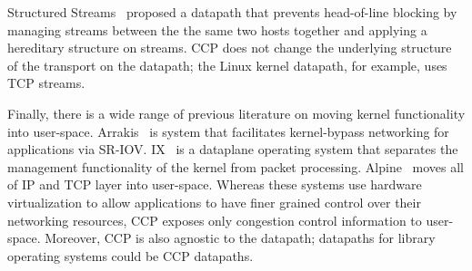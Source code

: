 Structured Streams~\cite{structuredstreams} proposed a datapath that prevents head-of-line blocking by managing streams between the the same two hosts together and applying a hereditary structure on streams. CCP does not change the underlying structure of the transport on the datapath; the Linux kernel datapath, for example, uses TCP streams. 

Finally, there is a wide range of previous literature on moving kernel functionality into user-space. 
Arrakis~\cite{arrakis2014} is system that facilitates kernel-bypass networking for applications via SR-IOV. 
IX~\cite{ix} is a dataplane operating system that separates the management functionality of the kernel from packet processing. 
Alpine~\cite{alpine} moves all of IP and TCP layer into user-space.
Whereas these systems use hardware virtualization to allow applications to have finer grained control over their networking resources,
CCP exposes only congestion control information to user-space. 
Moreover, CCP is also agnostic to the datapath; datapaths for library operating systems could be CCP datapaths.